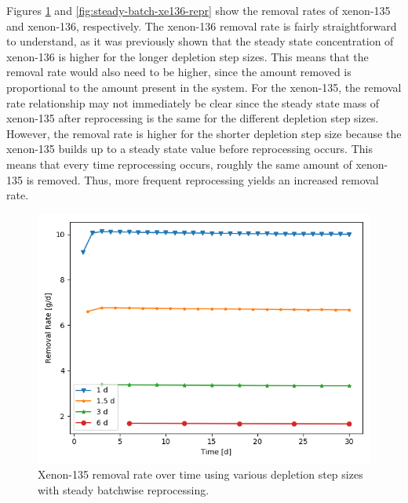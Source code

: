 {Figures \ref{fig:steady-batch-xe135-repr} and \ref{fig:steady-batch-xe136-repr} show the removal rates of xenon-135 and xenon-136, respectively. The xenon-136 removal rate is fairly straightforward to understand, as it was previously shown that the steady state concentration of xenon-136 is higher for the longer depletion step sizes. This means that the removal rate would also need to be higher, since the amount removed is proportional to the amount present in the system. For the xenon-135, the removal rate relationship may not immediately be clear since the steady state mass of xenon-135 after reprocessing is the same for the different depletion step sizes. However, the removal rate is higher for the shorter depletion step size because the xenon-135 builds up to a steady state value before reprocessing occurs. This means that every time reprocessing occurs, roughly the same amount of xenon-135 is removed. Thus, more frequent reprocessing yields an increased removal rate.

\begin{figure}[H]
  \centering
  \includegraphics[scale=0.7]{images/waste_Xe135_6d_sp_comp.png}
  \caption{Xenon-135 removal rate over time using various depletion step sizes with steady batchwise reprocessing.}
   \label{fig:steady-batch-xe135-repr}
\end{figure}

}

